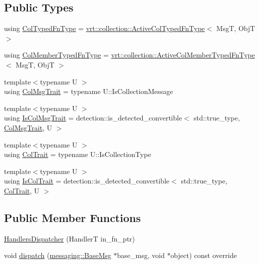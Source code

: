 \subsection*{Public Types}
\begin{DoxyCompactItemize}
\item 
using \hyperlink{structvt_1_1auto__registry_1_1_handlers_dispatcher_ad45c828eebdd2a18ffc0aa64f542a85c}{Col\+Typed\+Fn\+Type} = \hyperlink{namespacevt_1_1vrt_1_1collection_a939327f58a5838cf9d7dcc7f14d1670c}{vrt\+::collection\+::\+Active\+Col\+Typed\+Fn\+Type}$<$ MsgT, ObjT $>$
\item 
using \hyperlink{structvt_1_1auto__registry_1_1_handlers_dispatcher_a6f1a72ba3eec14527af044a478416b4d}{Col\+Member\+Typed\+Fn\+Type} = \hyperlink{namespacevt_1_1vrt_1_1collection_a87925616c03cf4ccc548d33b2fe172ee}{vrt\+::collection\+::\+Active\+Col\+Member\+Typed\+Fn\+Type}$<$ MsgT, ObjT $>$
\item 
{\footnotesize template$<$typename U $>$ }\\using \hyperlink{structvt_1_1auto__registry_1_1_handlers_dispatcher_aa2e8b80baa4dffdd9b2476ca9d2a7b46}{Col\+Msg\+Trait} = typename U\+::\+Is\+Collection\+Message
\item 
{\footnotesize template$<$typename U $>$ }\\using \hyperlink{structvt_1_1auto__registry_1_1_handlers_dispatcher_a585421b015b2d94915817c509e38b073}{Is\+Col\+Msg\+Trait} = detection\+::is\+\_\+detected\+\_\+convertible$<$ std\+::true\+\_\+type, \hyperlink{structvt_1_1auto__registry_1_1_handlers_dispatcher_aa2e8b80baa4dffdd9b2476ca9d2a7b46}{Col\+Msg\+Trait}, U $>$
\item 
{\footnotesize template$<$typename U $>$ }\\using \hyperlink{structvt_1_1auto__registry_1_1_handlers_dispatcher_a0d707c7f0650f1185b5628aa71a98c87}{Col\+Trait} = typename U\+::\+Is\+Collection\+Type
\item 
{\footnotesize template$<$typename U $>$ }\\using \hyperlink{structvt_1_1auto__registry_1_1_handlers_dispatcher_aa5e51c30b4d5124a98d04bdc2be043ac}{Is\+Col\+Trait} = detection\+::is\+\_\+detected\+\_\+convertible$<$ std\+::true\+\_\+type, \hyperlink{structvt_1_1auto__registry_1_1_handlers_dispatcher_a0d707c7f0650f1185b5628aa71a98c87}{Col\+Trait}, U $>$
\end{DoxyCompactItemize}
\subsection*{Public Member Functions}
\begin{DoxyCompactItemize}
\item 
\hyperlink{structvt_1_1auto__registry_1_1_handlers_dispatcher_aea820469903ae2c06a6e9934d3e8d0cc}{Handlers\+Dispatcher} (HandlerT in\+\_\+fn\+\_\+ptr)
\item 
void \hyperlink{structvt_1_1auto__registry_1_1_handlers_dispatcher_a3139ff15aaf26b383dad67114c785b95}{dispatch} (\hyperlink{structvt_1_1messaging_1_1_base_msg}{messaging\+::\+Base\+Msg} $\ast$base\+\_\+msg, void $\ast$object) const override
\end{DoxyCompactItemize}
